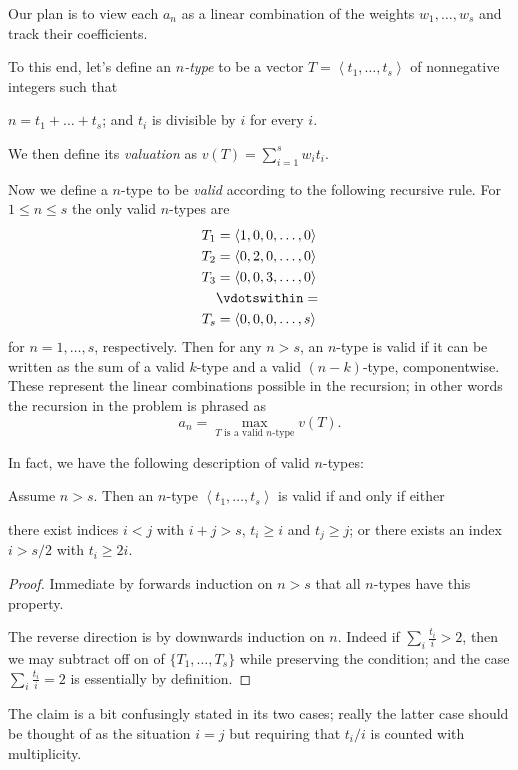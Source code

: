 \documentclass[11pt]{scrartcl}
\begin{document}
Our plan is to view each $a_n$ as a linear combination
of the weights $w_1, \dots, w_s$ and track their coefficients.

To this end, let's define an \emph{$n$-type}
to be a vector $T = \left< t_1, \dots, t_s\right>$
of nonnegative integers such that
\begin{itemize}
  \ii $n = t_1 + \dots + t_s$; and
  \ii $t_i$ is divisible by $i$ for every $i$.
\end{itemize}
We then define its \emph{valuation} as $v(T) = \sum_{i=1}^s w_i t_i$.

Now we define a $n$-type to be \emph{valid}
according to the following recursive rule.
For $1 \le n \le s$ the only valid $n$-types are
\begin{align*}
  T_1 &= \left< 1, 0, 0, \dots, 0 \right> \\
  T_2 &= \left< 0, 2, 0, \dots, 0 \right> \\
  T_3 &= \left< 0, 0, 3, \dots, 0 \right> \\
  &\vdotswithin= \\
  T_s &= \left< 0, 0, 0, \dots, s \right>
\end{align*}
for $n = 1, \dots, s$, respectively.
Then for any $n > s$, an $n$-type is valid
if it can be written as the sum of a valid $k$-type
and a valid $(n-k)$-type, componentwise.
These represent the linear combinations possible in the recursion;
in other words the recursion in the problem is phrased as
\[ a_n = \max_{T \text{ is a valid $n$-type}} v(T). \]

In fact, we have the following description of valid $n$-types:
\begin{claim*}
  Assume $n > s$.
  Then an $n$-type $\left< t_1, \dots, t_s \right>$ is valid
  if and only if either
  \begin{itemize}
    \ii there exist indices $i < j$ with $i+j > s$,
    $t_i \ge i$ and $t_j \ge j$; or
    \ii there exists an index $i > s/2$
    with $t_i \ge 2i$.
  \end{itemize}
\end{claim*}
\begin{proof}
  Immediate by forwards induction on $n > s$
  that all $n$-types have this property.

  The reverse direction is by downwards induction on $n$.
  Indeed if $\sum_i \frac{t_i}{i} > 2$,
  then we may subtract off on of $\{T_1, \dots, T_s\}$
  while preserving the condition;
  and the case $\sum_i \frac{t_i}{i} = 2$
  is essentially by definition.
\end{proof}
\begin{remark*}
  The claim is a bit confusingly stated in its two cases;
  really the latter case should be thought of as the situation
  $i=j$ but requiring that $t_i/i$ is counted with multiplicity.
\end{remark*}
\end{document}
